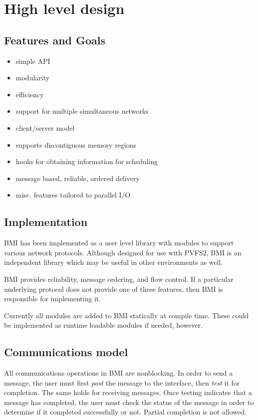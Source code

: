 \documentclass[11pt]{article}
\begin{document}
\section{High level design}
\label{sec:high}

\subsection{Features and Goals}

\begin{itemize}
\item simple API
\item modularity
\item efficiency
\item support for multiple simultaneous networks
\item client/server model
\item supports discontiguous memory regions
\item hooks for obtaining information for scheduling
\item message based, reliable, ordered delivery
\item misc. features tailored to parallel I/O
\end{itemize}

\subsection{Implementation}

BMI has been implemented as a user level library with 
modules to support various network protocols.  Although designed for use
with PVFS2, BMI is an independent library which may be useful in other
environments as well.

BMI provides reliability, message ordering, and flow control.  If a
particular underlying protocol does not provide one of these features,
then BMI is responsible for implementing it.

Currently all modules are added to BMI statically at compile time.
These could be implemented as runtime loadable modules if
needed, however.

\subsection{Communications model}

All communications operations in BMI are nonblocking.  In order to send a
message, the user must first \emph{post} the message to the interface,
then \emph{test} it for completion.  The same holds for receiving
messages.  Once testing indicates that a message has completed, the
user must check the status of the message in order to determine if it
completed successfully or not.  Partial completion is not allowed.
\end{document}
